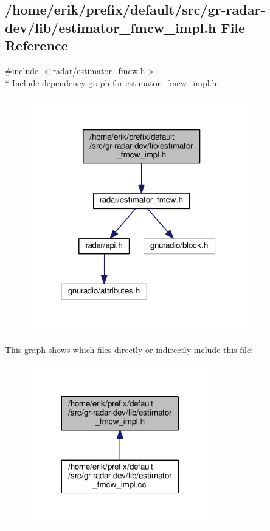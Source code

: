 \subsection{/home/erik/prefix/default/src/gr-\/radar-\/dev/lib/estimator\+\_\+fmcw\+\_\+impl.h File Reference}
\label{estimator__fmcw__impl_8h}
{\ttfamily \#include $<$radar/estimator\+\_\+fmcw.\+h$>$}\\*
Include dependency graph for estimator\+\_\+fmcw\+\_\+impl.\+h\+:
\nopagebreak
\begin{figure}[H]
\begin{center}
\leavevmode
\includegraphics[width=270pt]{db/d4b/estimator__fmcw__impl_8h__incl}
\end{center}
\end{figure}
This graph shows which files directly or indirectly include this file\+:
\nopagebreak
\begin{figure}[H]
\begin{center}
\leavevmode
\includegraphics[width=224pt]{d3/d67/estimator__fmcw__impl_8h__dep__incl}
\end{center}
\end{figure}

